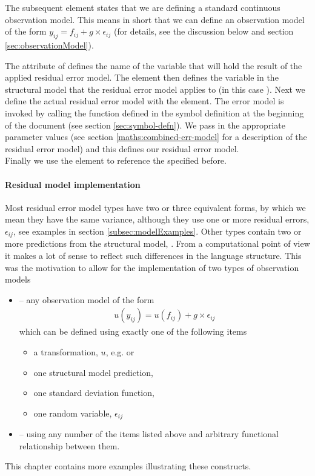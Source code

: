 The subsequent element  states that we are defining a standard
continuous observation model. This means in short that we can define
an observation model of the form $y_{ij} = f_{ij} + g\times\epsilon_{ij}$
(for details, see the discussion below and section \ref{sec:observationModel}).

The attribute  of  defines the name of the
variable that will hold the result of the applied residual error model.
The  element then defines the
variable in the structural model that the residual error model applies to
(in this case ). Next we define the actual residual error
model with the  element. The error model is invoked
by calling the function  defined in the symbol
definition at the beginning of the \pharmml document (see section
\ref{sec:symbol-defn}). We pass in the appropriate parameter values
(see section \ref{maths:combined-err-model} for a description of the
residual error model) and this defines our residual error model.\\
Finally we use the  element to reference the
 specified before.



\paragraph{Residual model implementation}
Most residual error model types have two or three equivalent forms, by which 
we mean they have the same variance, although they use one or more residual 
errors, $\epsilon_{ij}$, see examples in section \ref{subsec:modelExamples}. 
Other types contain two or more predictions from the structural model, . 
From a computational point of view it makes a lot of sense to reflect such 
differences in the language structure.
This was the motivation to allow for the implementation of two types of observation models
\begin{itemize}
\item
{} -- any observation model of the form
\begin{align*}
	u(y_{ij}) = u(f_{ij}) + g\times\epsilon_{ij}
\end{align*}
which can be defined using exactly one of the following items
\begin{itemize}
\item
a transformation, $u$, e.g.  or 
\item
one structural model prediction, 
\item
one standard deviation function, 
\item
one random variable, $\epsilon_{ij}$
\end{itemize}
\item
{} -- using any number of the items listed above and arbitrary functional relationship between them.
\end{itemize}
This chapter contains more examples illustrating these constructs.


